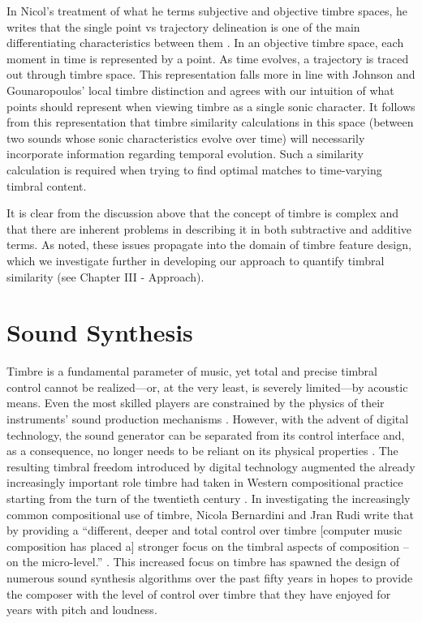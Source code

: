 \documentclass[12pt]{report} 	%
\numberwithin{figure}{chapter}
\numberwithin{table}{chapter}
\numberwithin{equation}{chapter}
\begin{document}
\begin{flushleft}
In Nicol's treatment of what he terms subjective and objective timbre spaces, he writes that the single point vs trajectory delineation is one of the main differentiating characteristics between them \cite[p. 56]{Nicol:2005rp}. In an objective timbre space, each moment in time is represented by a point. As time evolves, a trajectory is traced out through timbre space. This representation falls more in line with Johnson and Gounaropoulos' local timbre distinction \cite{Johnson:2006pi} and agrees with our intuition of what points should represent when viewing timbre as a single sonic character. It follows from this representation that timbre similarity calculations in this space (between two sounds whose sonic characteristics evolve over time) will necessarily incorporate information regarding temporal evolution. Such a similarity calculation is required when trying to find optimal matches to time-varying timbral content.

It is clear from the discussion above that the concept of timbre is complex and that there are inherent problems in describing it in both subtractive and additive terms. As noted, these issues propagate into the domain of timbre feature design, which we investigate further in developing our approach to quantify timbral similarity (see Chapter III - Approach).
\vspace{12pt}
\section{Sound Synthesis}

Timbre is a fundamental parameter of music, yet total and precise timbral control cannot be realized---or, at the very least, is severely limited---by acoustic means. Even the most skilled players are constrained by the physics of their instruments' sound production mechanisms \cite[p. 11]{Wessel:2002uk}. However, with the advent of digital technology, the sound generator can be separated from its control interface and, as a consequence, no longer needs to be reliant on its physical properties \cite[p. 1]{Malloch:2006jb}. The resulting timbral freedom introduced by digital technology augmented the already increasingly important role timbre had taken in Western compositional practice starting from the turn of the twentieth century \cite[p. 1]{Klingbeil:2009lo}. In investigating the increasingly common compositional use of timbre, Nicola Bernardini and Jran Rudi write that by providing a ``different, deeper and total control over timbre [computer music composition has placed a] stronger focus on the timbral aspects of composition -- on the micro-level.'' \cite[p. 3]{Bernardini:2001kc}. This increased focus on timbre has spawned the design of numerous sound synthesis algorithms over the past fifty years in hopes to provide the composer with the level of control over timbre that they have enjoyed for years with pitch and loudness.


\end{flushleft}
\end{document}
